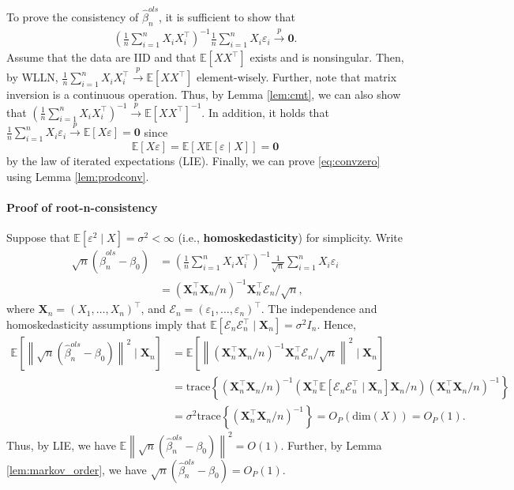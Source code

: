 \documentclass[10.5pt, A4paper, openany, uplatex]{book}
\newcommand{\mbf}{\mathbf}
\newcommand{\mcl}{\mathcal}
\newcommand{\eps}{\varepsilon}
\newcommand{\E}{\mathbb{E}}
\renewcommand{\hat}{\widehat}
\numberwithin{equation}{section}
\begin{document}
To prove the consistency of $\hat \beta_n^{ols}$, it is sufficient to show that
\begin{align}\label{eq:convzero}
	\left(\frac{1}{n}\sum_{i = 1}^n X_i X_i^\top \right)^{-1}\frac{1}{n}\sum_{i = 1}^n X_i \eps_i \overset{p}{\to} \mbf{0}.
\end{align}
Assume that the data are IID and that $\E[XX^\top]$ exists and is nonsingular.
Then, by WLLN, $\frac{1}{n}\sum_{i = 1}^n X_i X_i^\top \overset{p}{\to} \E[XX^\top]$ element-wisely.
Further, note that matrix inversion is a continuous operation.
Thus, by Lemma \ref{lem:cmt}, we can also show that $\left(\frac{1}{n}\sum_{i = 1}^n X_i X_i^\top \right)^{-1} \overset{p}{\to} \E[XX^\top]^{-1}$.
In addition, it holds that $\frac{1}{n}\sum_{i = 1}^n X_i \eps_i \overset{p}{\to} \E[X \eps] = \mbf{0}$ since
\[
	\E[X \eps ] = \E[X \E[\eps \mid X]] = \mbf{0}
\]
by the law of iterated expectations (LIE).
Finally, we can prove \eqref{eq:convzero} using Lemma \ref{lem:prodconv}.

\paragraph{Proof of root-n-consistency}

Suppose that $\E[\eps^2 \mid X ] = \sigma^2 < \infty$ (i.e., \textbf{homoskedasticity}) for simplicity.
Write
\begin{align*}
	\sqrt{n}(\hat \beta_n^{ols} - \beta_0) 
	& = \left(\frac{1}{n}\sum_{i = 1}^n X_i X_i^\top \right)^{-1}\frac{1}{\sqrt{n}}\sum_{i = 1}^n X_i \eps_i\\
	& = \left(\mbf{X}_n^\top \mbf{X}_n/n\right)^{-1}\mbf{X}_n^\top\mcl{E}_n/\sqrt{n},
\end{align*}
where $\mbf{X}_n = (X_1, \ldots, X_n)^\top$, and $\mcl{E}_n = (\eps_1, \ldots, \eps_n)^\top$.
The independence and homoskedasticity assumptions imply that $\E[\mcl{E}_n\mcl{E}_n^\top \mid \mbf{X}_n] = \sigma^2 I_n$.
Hence,
\begin{align*}
	\E\left[\left\|\sqrt{n}(\hat \beta_n^{ols} - \beta_0)\right\|^2 \mid \mbf{X}_n \right]
	& = \E\left[\left\|\left(\mbf{X}_n^\top \mbf{X}_n/n\right)^{-1}\mbf{X}_n^\top\mcl{E}_n/\sqrt{n} \right\|^2 \mid \mbf{X}_n \right] \\
	& = \text{trace}\left\{\left(\mbf{X}_n^\top \mbf{X}_n/n\right)^{-1} \left(\mbf{X}_n^\top \E[\mcl{E}_n\mcl{E}_n^\top \mid \mbf{X}_n] \mbf{X}_n/n \right) \left(\mbf{X}_n^\top \mbf{X}_n/n\right)^{-1}\right\} \\
	& = \sigma^2 \text{trace}\left\{\left(\mbf{X}_n^\top \mbf{X}_n/n\right)^{-1}\right\} = O_P(\text{dim}(X)) = O_P(1).
\end{align*}
Thus, by LIE, we have $\E\left\|\sqrt{n}(\hat \beta_n^{ols} - \beta_0)\right\|^2 = O(1)$.
Further, by Lemma \ref{lem:markov_order}, we have $\sqrt{n}(\hat \beta_n^{ols} - \beta_0) = O_P(1)$.
\end{document}
